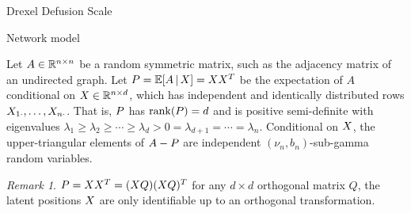 \documentclass[aspectratio=169]{beamer}
\theoremstyle{remark}
\newtheorem*{remark}{Remark}
\begin{document}
\begin{frame}{Drexel Defusion Scale}

\end{frame}

\begin{frame}{Network model}

    \begin{definition}
        Let $A \in \mathbb{R}^{n \times n}$ be a random symmetric matrix, such as the adjacency matrix of an undirected graph. Let $\Apop = \E[\X]{A} = \X \X^T$ be the expectation of $A$ conditional on $X \in \mathbb{R}^{n \times d}$, which has independent and identically distributed rows $X_{1 \cdot}, \dots, X_{n \cdot}$. That is, $P$ has $\rank \paren*{\Apop} = d$ and is positive semi-definite with eigenvalues $\lambda_1 \ge \lambda_2 \ge \cdots \ge \lambda_d > 0 = \lambda_{d+1} = \cdots = \lambda_n$. Conditional on $X$, the upper-triangular elements of $A - P$ are independent $(\nu_n, b_n)$-sub-gamma random variables.
    \end{definition}

    \begin{remark}
        $P = X X^T = (X Q) (X Q)^T$ for any $d \times d$ orthogonal matrix $Q$, the latent positions $X$ are only identifiable up to an orthogonal transformation.
    \end{remark}

\end{frame}



\end{document}
